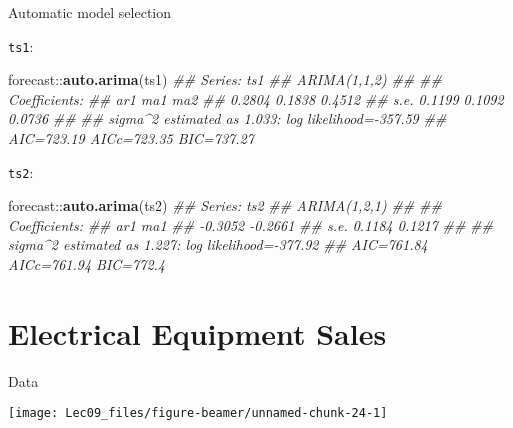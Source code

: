\documentclass[11pt,ignorenonframetext,]{beamer}
\newenvironment{Shaded}{}{}
\newcommand{\CommentTok}[1]{\textcolor[rgb]{0.38,0.63,0.69}{\textit{#1}}}
\newcommand{\KeywordTok}[1]{\textcolor[rgb]{0.00,0.44,0.13}{\textbf{#1}}}
\newcommand{\NormalTok}[1]{#1}
\newcommand{\OperatorTok}[1]{\textcolor[rgb]{0.40,0.40,0.40}{#1}}
\let\oldShaded\Shaded
\let\endoldShaded\endShaded
\renewenvironment{Shaded}{\footnotesize\begin{spacing}{0.9}\oldShaded}{\endoldShaded\end{spacing}}
\let\oldverbatim\verbatim
\let\endoldverbatim\endverbatim
\newcommand{\scriptoutput}{
  \renewenvironment{Shaded}{\scriptsize\begin{spacing}{0.9}\oldShaded}{\endoldShaded\end{spacing}}
  \renewenvironment{verbatim}{\scriptsize\begin{spacing}{0.9}\oldverbatim}{\endoldverbatim\end{spacing}}
}
\begin{document}
\begin{frame}[fragile]{Automatic model selection}
\protect\hypertarget{automatic-model-selection}{}

\scriptoutput

\texttt{ts1}:

\begin{Shaded}
\begin{Highlighting}[]
\NormalTok{forecast}\OperatorTok{::}\KeywordTok{auto.arima}\NormalTok{(ts1)}
\CommentTok{## Series: ts1 }
\CommentTok{## ARIMA(1,1,2) }
\CommentTok{## }
\CommentTok{## Coefficients:}
\CommentTok{##          ar1     ma1     ma2}
\CommentTok{##       0.2804  0.1838  0.4512}
\CommentTok{## s.e.  0.1199  0.1092  0.0736}
\CommentTok{## }
\CommentTok{## sigma^2 estimated as 1.033:  log likelihood=-357.59}
\CommentTok{## AIC=723.19   AICc=723.35   BIC=737.27}
\end{Highlighting}
\end{Shaded}

\texttt{ts2}:

\begin{Shaded}
\begin{Highlighting}[]
\NormalTok{forecast}\OperatorTok{::}\KeywordTok{auto.arima}\NormalTok{(ts2)}
\CommentTok{## Series: ts2 }
\CommentTok{## ARIMA(1,2,1) }
\CommentTok{## }
\CommentTok{## Coefficients:}
\CommentTok{##           ar1      ma1}
\CommentTok{##       -0.3052  -0.2661}
\CommentTok{## s.e.   0.1184   0.1217}
\CommentTok{## }
\CommentTok{## sigma^2 estimated as 1.227:  log likelihood=-377.92}
\CommentTok{## AIC=761.84   AICc=761.94   BIC=772.4}
\end{Highlighting}
\end{Shaded}

\end{frame}

\hypertarget{electrical-equipment-sales}{%
\section{Electrical Equipment Sales}\label{electrical-equipment-sales}}

\begin{frame}{Data}
\protect\hypertarget{data}{}

\begin{center}\texttt{[image: Lec09\_files/figure-beamer/unnamed-chunk-24-1]} \end{center}

\end{frame}
\end{document}
